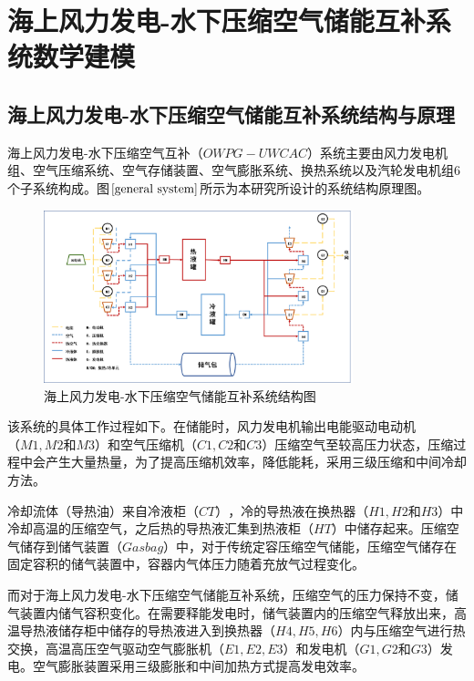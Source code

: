 \documentclass{jnuthesis}
\begin{document}
	
	\chapter{海上风力发电-水下压缩空气储能互补系统数学建模}
	\vspace{-2em} 
	\section{海上风力发电-水下压缩空气储能互补系统结构与原理}
	
	海上风力发电-水下压缩空气互补$ （OWPG-UWCAC） $系统主要由风力发电机组、空气压缩系统、空气存储装置、空气膨胀系统、换热系统以及汽轮发电机组$ 6 $个子系统构成。图$ \fontsize{10.5bp}{10pt}\ref{general system} $所示为本研究所设计的系统结构原理图。\\
	
	\begin{figure}[H] %
		\centering %
		\includegraphics[width=0.8\textwidth]{pictures/screenshot001} %
		\caption{\fontsize{10.5bp}{10pt}海上风力发电-水下压缩空气储能互补系统结构图} %
		\label{general system} %
	\end{figure}%
	
	
	该系统的具体工作过程如下。在储能时，风力发电机输出电能驱动电动机$ （M1,M2$和$M3） $和空气压缩机$ （C1,C2 $和$ C3） $压缩空气至较高压力状态，压缩过程中会产生大量热量，为了提高压缩机效率，降低能耗，采用三级压缩和中间冷却方法。
	\par 冷却流体（导热油）来自冷液柜$ （CT） $，冷的导热液在换热器$ （H1,H2和H3） $中冷却高温的压缩空气，之后热的导热液汇集到热液柜$ （HT） $中储存起来。压缩空气储存到储气装置$ （Gasbag） $中，对于传统定容压缩空气储能，压缩空气储存在固定容积的储气装置中，容器内气体压力随着充放气过程变化。
	\par 而对于海上风力发电-水下压缩空气储能互补系统，压缩空气的压力保持不变，储气装置内储气容积变化。在需要释能发电时，储气装置内的压缩空气释放出来，高温导热液储存柜中储存的导热液进入到换热器$ （H4,H5,H6） $内与压缩空气进行热交换，高温高压空气驱动空气膨胀机$ （E1,E2,E3） $和发电机$ （G1,G2 $和$ G3） $发电。空气膨胀装置采用三级膨胀和中间加热方式提高发电效率。
	
\end{document}
